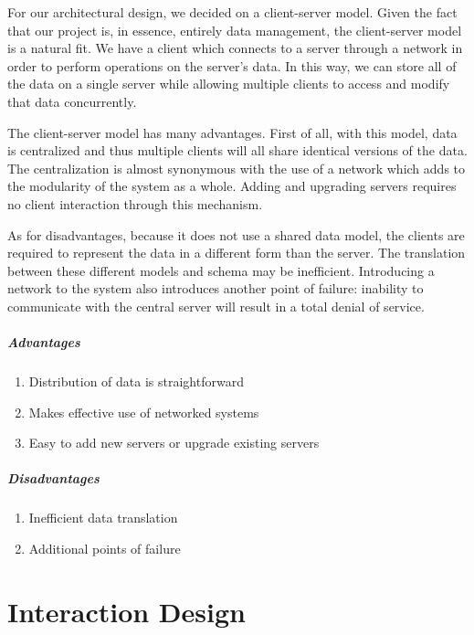\documentclass[a4paper]{report}
\begin{document}
	For our architectural design, we decided on a client-server model. Given the fact that our project is, in essence, entirely data management, the client-server model is a natural fit. We have a client which connects to a server through a network in order to perform operations on the server’s data. In this way, we can store all of the data on a single server while allowing multiple clients to access and modify that data concurrently.

	The client-server model has many advantages. First of all, with this model, data is centralized and thus multiple clients will all share identical versions of the data. The centralization is almost synonymous with the use of a network which adds to the modularity of the system as a whole. Adding and upgrading servers requires no client interaction through this mechanism.

	As for disadvantages, because it does not use a shared data model, the clients are required to represent the data in a different form than the server. The translation between these different models and schema may be inefficient. Introducing a network to the system also introduces another point of failure: inability to communicate with the central server will result in a total denial of service.

	\paragraph{Advantages}
	\begin{enumerate}
		\item Distribution of data is straightforward
		\item Makes effective use of networked systems
		\item Easy to add new servers or upgrade existing servers
	\end{enumerate}

	\paragraph{Disadvantages}
	\begin{enumerate}
		\item Inefficient data translation
		\item Additional points of failure
	\end{enumerate}

\chapter{Interaction Design}
\end{document}
